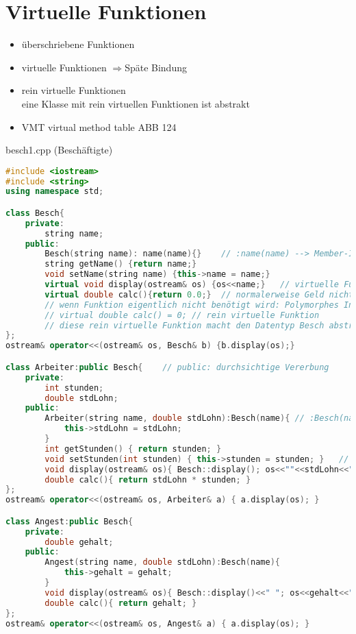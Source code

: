 \section{Virtuelle Funktionen}
\begin{itemize}
\item überschriebene Funktionen 
\item virtuelle Funktionen $\Rightarrow$Späte Bindung
\item rein virtuelle Funktionen\\
eine Klasse mit rein virtuellen Funktionen ist abstrakt
\item VMT virtual method table ABB 124
\end{itemize}
besch1.cpp (Beschäftigte)
\begin{lstlisting}[language=C++]
#include <iostream>
#include <string>
using namespace std;

class Besch{
	private:
		string name;
	public:	
		Besch(string name): name(name){}	// :name(name) --> Member-Initialisierer
		string getName() {return name;}
		void setName(string name) {this->name = name;}
		virtual void display(ostream& os) {os<<name;}	// virtuelle Funktion
		virtual double calc(){return 0.0;}	// normalerweise Geld nicht mit double, sondern ganzzahlig rechnen!
		// wenn Funktion eigentlich nicht benötigt wird: Polymorphes Interface:
		// virtual double calc() = 0; // rein virtuelle Funktion
		// diese rein virtuelle Funktion macht den Datentyp Besch abstract! D.h. davon kann keine Instanz erzeugt werden (wie in der Main passiert)!
};
ostream& operator<<(ostream& os, Besch& b) {b.display(os);}

class Arbeiter:public Besch{	// public: durchsichtige Vererbung
	private:
		int stunden;
		double stdLohn;
	public:
		Arbeiter(string name, double stdLohn):Besch(name){ // :Besch(name) --> Basis-Initialisierer
			this->stdLohn = stdLohn;
		}
		int getStunden() { return stunden; }
		void setStunden(int stunden) { this->stunden = stunden; }	// usw. getter und setter
		void display(ostream& os){ Besch::display(); os<<""<<stdLohn<<" "<<stunden<<" "<<calc();}
		double calc(){ return stdLohn * stunden; }
};
ostream& operator<<(ostream& os, Arbeiter& a) { a.display(os); }

class Angest:public Besch{
	private:
		double gehalt;
	public:
		Angest(string name, double stdLohn):Besch(name){
			this->gehalt = gehalt;
		}
		void display(ostream& os){ Besch::display()<<" "; os<<gehalt<<" ";}
		double calc(){ return gehalt; }
};
ostream& operator<<(ostream& os, Angest& a) { a.display(os); }


\end{lstlisting}
